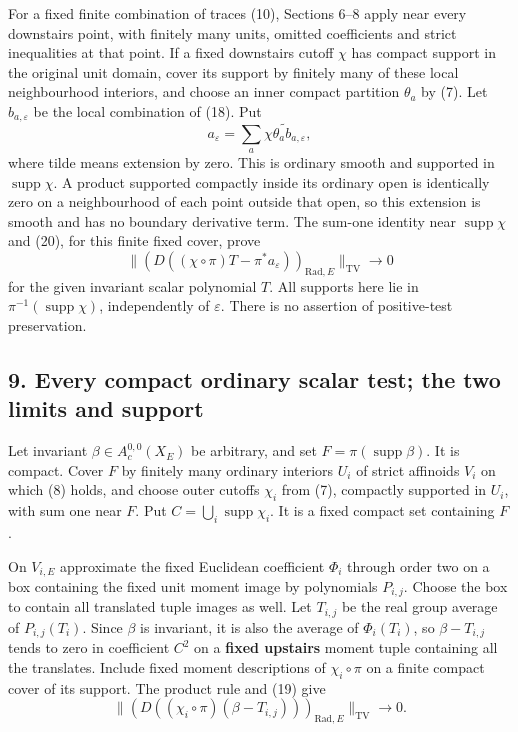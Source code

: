 \documentclass[
  11pt,
]{article}
\begin{document}
For a fixed finite combination of traces (10), Sections 6--8 apply near
every downstairs point, with finitely many units, omitted coefficients
and strict inequalities at that point. If a fixed downstairs cutoff
\(\chi\) has compact support in the original unit domain, cover its
support by finitely many of these local neighbourhood interiors, and
choose an inner compact partition \(\theta_a\) by (7). Let
\(b_{a,\varepsilon}\) be the local combination of (18). Put \[
        a_\varepsilon=
              \sum_a\widetilde{\chi\theta_a b_{a,\varepsilon}},     \tag{21}
\] where tilde means extension by zero. This is ordinary smooth and
supported in \(\operatorname{supp}\chi\). A product supported compactly
inside its ordinary open is identically zero on a neighbourhood of each
point outside that open, so this extension is smooth and has no boundary
derivative term. The sum-one identity near \(\operatorname{supp}\chi\)
and (20), for this finite fixed cover, prove \[
 \big\|(D((\chi\circ\pi)T-\pi^*a_\varepsilon))_{
                      \mathrm{Rad},E}\big\|_{\mathrm{TV}}\to0       \tag{22}
\] for the given invariant scalar polynomial \(T\). All supports here
lie in \(\pi^{-1}(\operatorname{supp}\chi)\), independently of
\(\varepsilon\). There is no assertion of positive-test preservation.

\subsection{9. Every compact ordinary scalar test; the two limits and
support}\label{every-compact-ordinary-scalar-test-the-two-limits-and-support}

Let invariant \(\beta\in A_c^{0,0}(X_E)\) be arbitrary, and set
\(F=\pi(\operatorname{supp}\beta)\). It is compact. Cover \(F\) by
finitely many ordinary interiors \(U_i\) of strict affinoids \(V_i\) on
which (8) holds, and choose outer cutoffs \(\chi_i\) from (7), compactly
supported in \(U_i\), with sum one near \(F\). Put
\(C=\bigcup_i\operatorname{supp}\chi_i\). It is a fixed compact set
containing \(F\).

On \(V_{i,E}\) approximate the fixed Euclidean coefficient \(\Phi_i\)
through order two on a box containing the fixed unit moment image by
polynomials \(P_{i,j}\). Choose the box to contain all translated tuple
images as well. Let \(T_{i,j}\) be the real group average of
\(P_{i,j}(T_i)\). Since \(\beta\) is invariant, it is also the average
of \(\Phi_i(T_i)\), so \(\beta-T_{i,j}\) tends to zero in coefficient
\(C^2\) on a \textbf{fixed upstairs} moment tuple containing all the
translates. Include fixed moment descriptions of \(\chi_i\circ\pi\) on a
finite compact cover of its support. The product rule and (19) give \[
 \big\|(D((\chi_i\circ\pi)(\beta-T_{i,j})))_{
                     \mathrm{Rad},E}\big\|_{\mathrm{TV}}\to0.       \tag{23}
\]
\end{document}
